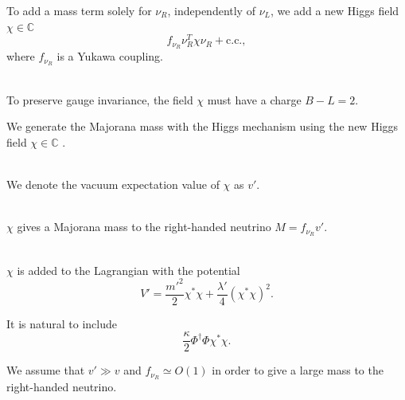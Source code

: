 \documentclass[14pt]{beamer}
\begin{document}


\begin{frame}
To add a mass term solely for $\nu_R$, independently of $\nu_L$, we add a new Higgs field $\chi\in\mathbb{C}$
$$f_{\nu_R} \nu_R^T \chi \nu_R + \text{c.c.},$$
where $f_{\nu_R}$ is a Yukawa coupling. \\~\

To preserve gauge invariance, the field $\chi$ must have a charge $B-L=2$.
\end{frame}

\begin{frame}
We generate the Majorana mass with the Higgs mechanism using the new Higgs field $\chi \in \mathbb{C}$ .\\~\

We denote the vacuum expectation value of $\chi$ as $v'$. \\~\

$\chi$ gives a Majorana mass to the right-handed neutrino $M = f_{\nu_R} v'$.  \\~\

\end{frame}

\begin{frame}

$\chi$ is added to the Lagrangian with the potential
$$V' = \frac{m'^{2}}{2}\chi^*\chi+\frac{\lambda'}{4}(\chi^*\chi)^2.$$ 

It is natural to include  
$$ \frac{\kappa}{2}\Phi^{\dagger}\Phi\chi^*\chi.$$

We assume that $v'\gg v$ and $f_{\nu_R}\simeq O(1)$ in order to give a large mass to the right-handed neutrino.
\end{frame}
\end{document}
